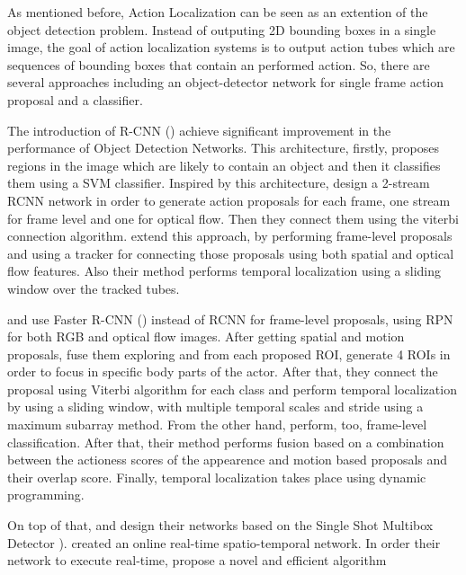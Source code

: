As mentioned before, Action Localization can be seen as an extention of the object detection problem. Instead of outputing 2D bounding
boxes in a single image, the goal of action localization systems is to output action tubes which are sequences of bounding boxes that
contain an performed action. So, there are several approaches including an object-detector network for single frame
action proposal and a classifier. \par
The introduction of R-CNN (\cite{DBLP:journals/corr/GirshickDDM13}) achieve significant improvement
in the performance of Object Detection Networks. This architecture, firstly, proposes regions in the image which are likely to
contain an object and then it classifies them using a SVM classifier. Inspired by this architecture, \cite{DBLP:journals/corr/GkioxariM14}
design a 2-stream RCNN network in order to generate action proposals for each frame, one stream for frame level and one for optical flow.
Then they  connect them using the viterbi connection algorithm. \cite{DBLP:journals/corr/WeinzaepfelHS15} extend this approach, by performing
frame-level proposals and using a tracker for connecting those proposals using both spatial and optical flow features. Also their method performs
temporal localization using a sliding window over the tracked tubes. \par
\cite{peng:hal-01349107} and \cite{DBLP:journals/corr/SahaSSTC16} use Faster R-CNN (\cite{Ren:2015:FRT:2969239.2969250}) instead of RCNN
for frame-level proposals, using RPN for both RGB and optical flow images.
After getting spatial and motion proposals,\cite{peng:hal-01349107} fuse them exploring and from each proposed ROI, generate 4 ROIs in order to focus in specific
body parts of the actor. After that, they connect the proposal using Viterbi algorithm for each class and perform temporal localization by using a sliding window, with multiple
temporal scales and stride using a maximum subarray method. From the other hand, \cite{DBLP:journals/corr/SahaSSTC16} perform, too, frame-level classification. After that,
their method performs fusion based on a combination between the actioness scores of the appearence and motion based proposals and their overlap score. Finally, temporal localization
takes place using dynamic programming. \par
On top of that, \cite{singh2016online} and \cite{kalogeiton17iccv:hal-01519812} design their networks based on the Single Shot Multibox Detector \cite{DBLP:journals/corr/LiuAESR15}).
\cite{singh2016online} created an online real-time spatio-temporal network. In order their network to execute real-time,  \cite{singh2016online} propose a novel and efficient algorithm
